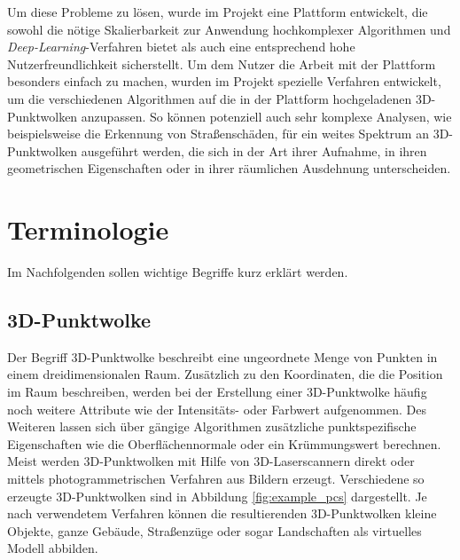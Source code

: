 Um diese Probleme zu lösen, wurde im Projekt eine Plattform entwickelt, die sowohl die nötige Skalierbarkeit zur Anwendung hochkomplexer Algorithmen und \textit{Deep-Learning}-Verfahren bietet als auch eine entsprechend hohe Nutzerfreundlichkeit sicherstellt. Um dem Nutzer die Arbeit mit der Plattform besonders einfach zu machen, wurden im Projekt spezielle Verfahren entwickelt, um die verschiedenen Algorithmen auf die in der Plattform hochgeladenen 3D-Punktwolken anzupassen. So können potenziell auch sehr komplexe Analysen, wie beispielsweise die Erkennung von Straßenschäden, für ein weites Spektrum an 3D-Punktwolken ausgeführt werden, die sich in der Art ihrer Aufnahme, in ihren geometrischen Eigenschaften oder in ihrer räumlichen Ausdehnung unterscheiden.

\section{Terminologie}

Im Nachfolgenden sollen wichtige Begriffe kurz erklärt werden.

\subsection*{3D-Punktwolke}
Der Begriff 3D-Punktwolke beschreibt eine ungeordnete Menge von Punkten in einem dreidimensionalen Raum. Zusätzlich zu den Koordinaten, die die Position im Raum beschreiben, werden bei der Erstellung einer 3D-Punktwolke häufig noch weitere Attribute wie der Intensitäts- oder Farbwert aufgenommen. Des Weiteren lassen sich über gängige Algorithmen zusätzliche punktspezifische Eigenschaften wie die Oberflächennormale \citep{Mitra.Nguyen-2003} oder ein Krümmungswert \citep{Ho.Gibbins-2009} berechnen. Meist werden 3D-Punktwolken mit Hilfe von 3D-Laserscannern direkt oder mittels photogrammetrischen Verfahren aus Bildern erzeugt. Verschiedene so erzeugte 3D-Punktwolken sind in Abbildung \ref{fig:example_pcs} dargestellt. Je nach verwendetem Verfahren können die resultierenden 3D-Punktwolken kleine Objekte, ganze Gebäude, Straßenzüge oder sogar Landschaften als virtuelles Modell abbilden.

